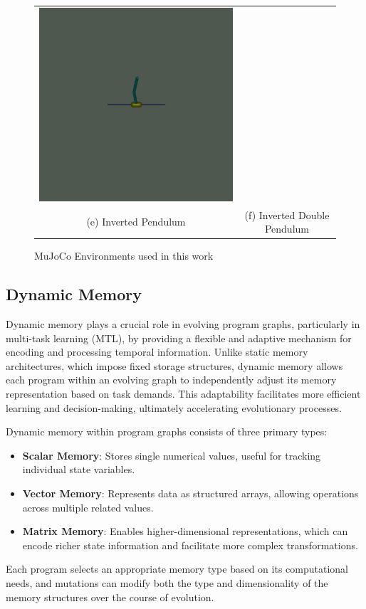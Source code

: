 \documentclass[sigconf]{acmart}
\begin{document}
\begin{figure}[t]
\begin{tabular}{cc}
    \includegraphics[width=0.3\linewidth]{assets/inverted_double_pendulum} \\
    (e) Inverted Pendulum & (f) Inverted Double Pendulum \\
  \end{tabular}
  \caption{MuJoCo Environments used in this work}
  \label{fig:mujoco_env}
\end{figure}

\subsection{Dynamic Memory}
Dynamic memory plays a crucial role in evolving program graphs, particularly 
in multi-task learning (MTL), by providing a flexible and adaptive
mechanism for encoding and processing temporal information. Unlike static memory 
architectures, which impose fixed storage structures, dynamic memory allows each 
program within an evolving graph to independently adjust its memory representation 
based on task demands. This adaptability facilitates more efficient learning and 
decision-making, ultimately accelerating evolutionary processes.

Dynamic memory within program graphs consists of three primary types:
\begin{itemize}
  \item \textbf{Scalar Memory}: Stores single numerical values, useful for tracking individual state variables.
  \item \textbf{Vector Memory}: Represents data as structured arrays, allowing operations across multiple related values.
  \item \textbf{Matrix Memory}: Enables higher-dimensional representations, which can encode richer state information 
  and facilitate more complex transformations.
\end{itemize}

Each program selects an appropriate memory type based on its computational needs, 
and mutations can modify both the type and dimensionality of the memory structures over the course of evolution.
\end{document}
